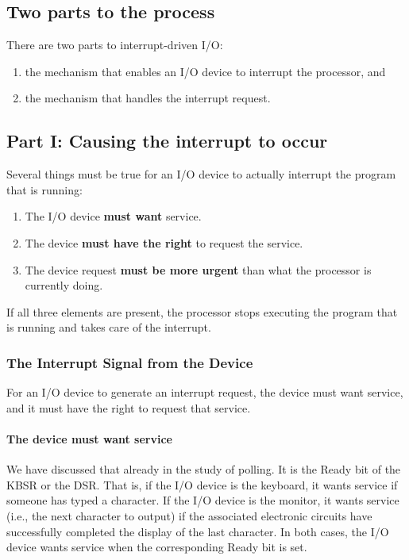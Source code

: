 \documentclass{patt}
\begin{document}
\subsection{Two parts to the process}

There are two parts to interrupt-driven I/O: 

\begin{enumerate}
\item the mechanism that enables an I/O device to interrupt the processor, and 
\item the mechanism that handles the interrupt request.
\end{enumerate}

\subsection{Part I: Causing the interrupt to occur}

\noindent
Several things must be true for an I/O device to
actually interrupt the program that is running:

\begin{enumerate}
\item The I/O device {\bf must want} service.
\item The device {\bf must have the right} to request the service.
\item The device request {\bf must be more urgent} than what the processor
  is currently doing.
\end{enumerate}
If all three elements are present, the processor stops executing the
program that is running and takes care of the interrupt.

\subsubsection{The Interrupt Signal from the Device}

For an I/O device to generate an interrupt request, the device must want
service, and it must have the right to request that service.

\paragraph{The device must want service}  We have discussed that already in the 
study of polling.  It is the Ready bit of the KBSR or the DSR.  That is, 
if the I/O device is the keyboard, it wants service if someone has typed a
character.  If the I/O device is the monitor, it wants service (i.e.,
the next character to output) if the associated electronic circuits
have successfully completed the display of the last character.  In
both cases, the I/O device wants service when the corresponding Ready
bit is set.
\end{document}
